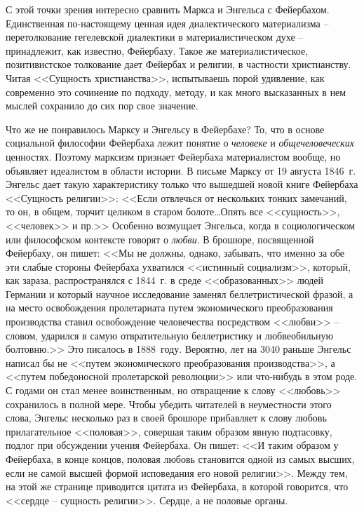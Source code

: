 \documentclass{book}
\begin{document}
С этой точки зрения интересно сравнить Маркса и Энгельса с Фейербахом. Единственная по-настоящему ценная идея диалек­тического 
материализма -- перетолкование гегелевской диа­лектики в материалистическом духе -- принадлежит, как извест­но, Фейербаху. Такое 
же материалистическое, позитивистское толкование дает Фейербах и религии, в частности христианству. Читая <<Сущность 
христианства>>, испытываешь порой удивле­ние, как современно это сочинение по подходу, методу, и как много высказанных в нем 
мыслей сохранило до сих пор свое значение.

Что же не понравилось Марксу и Энгельсу в Фейербахе? То, что в основе социальной философии Фейербаха лежит понятие о 
\textit{человеке}  и \textit{общечеловеческих} ценностях. Поэтому марксизм признает Фейербаха материалистом вообще, но объявляет 
иде­алистом в области истории. В письме Марксу от 19 августа 1846~г. Энгельс дает такую характеристику только что вышед­шей новой 
книге Фейербаха <<Сущность религии>>: <<Если от­влечься от нескольких тонких замечаний, то он, в общем, торчит целиком в старом 
болоте\ldots Опять все <<сущность>>, <<человек>> и пр.>> Особенно возмущает Энгельса, когда в социологическом или философском 
контексте говорят о \textit{любви}.  В брошюре, по­священной Фейербаху, он пишет: <<Мы не должны, однако, забы­вать, что именно за 
обе эти слабые стороны Фейербаха ухватился <<истинный социализм>>, который, как зараза, распространялся с 1844~г. в среде 
<<образованных>> людей Германии и который научное исследование заменял беллетристической фразой, а на место освобождения 
пролетариата путем экономического пре­образования производства ставил освобождение человечества посредством <<любви>> -- словом, 
ударился в самую отвратитель­ную беллетристику и любвеобильную болтовню.>>%
Это писа­лось в 1888~году. Вероятно, лет на 3040 
раньше Энгельс написал бы не <<путем экономического преобразования производства>>, а <<путем победоносной пролетарской революции>> 
или что-нибудь в этом роде. С годами он стал менее воинственным, но отвращение к слову <<любовь>> сохранилось в полной мере. Чтобы 
убедить читателей в неуместности этого слова, Энгельс несколько раз в своей брошюре прибавляет к слову любовь прилагательное 
<<половая>>, совершая таким образом явную подтасовку, подлог при обсуждении учения Фейербаха. Он пи­шет: <<И таким образом у 
Фейербаха, в конце концов, половая любовь становится одной из самых высших, если не самой выс­шей формой исповедания его новой 
религии>>.%
Между тем, на этой же странице приводится цитата из Фейербаха, в кото­рой говорится, что <<сердце -- сущность 
религии>>. Сердце, а не половые органы.
\end{document}
